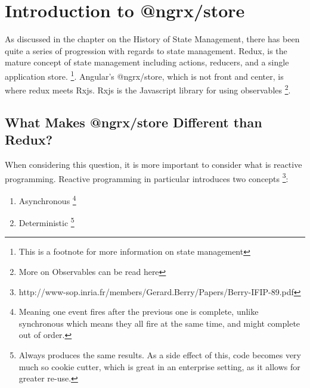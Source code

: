\maketitle{}
\section{ Introduction to @ngrx/store }

As discussed in the chapter on the History of State Management, there has
been quite a series of progression with regards to state management. Redux, is
the mature concept of state management including actions, reducers, and a single
application store. \footnote{This is a footnote for more information on state management}.
Angular's @ngrx/store, which is not front and center, is where redux meets Rxjs.
Rxjs is the Javascript library for using observables
\footnote{More on Observables can be read here}.

\subsection{What Makes @ngrx/store Different than Redux?}
When considering this question, it is more important to consider what is
reactive programming. Reactive programming in particular introduces two concepts
\footnote{http://www-sop.inria.fr/members/Gerard.Berry/Papers/Berry-IFIP-89.pdf}:

\begin{enumerate}
  \item Asynchronous \footnote{Meaning one event fires after the previous one is
  complete, unlike synchronous which means they all fire at the same time, and
  might complete out of order.}
  \item Deterministic \footnote{Always produces the same results. As a side
  effect of this, code becomes very much so cookie cutter, which is great in
  an enterprise setting, as it allows for greater re-use.}
\end{enumerate}
